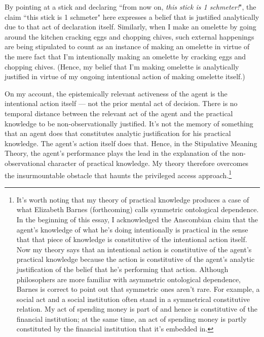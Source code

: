 \documentclass[a4paper,12pt]{article}
\begin{document}

By pointing at a stick and declaring ``from now on, \emph{this stick is 1 schmeter!}", the claim ``this stick is 1 schmeter" here expresses a belief that is justified analytically due to that act of declaration itself. Similarly, when I make an omelette by going around the kitchen cracking eggs and chopping chives, such external happenings are being stipulated to count as an instance of making an omelette in virtue of the mere fact that I'm intentionally making an omelette by cracking eggs and chopping chives. (Hence, my belief that I'm making omelette is analytically justified in virtue of my ongoing intentional action of making omelette itself.)

On my account, the epistemically relevant activeness of the agent is the intentional action itself --- not the prior mental act of decision. There is no temporal distance between the relevant act of the agent and the practical knowledge to be non-observationally justified. It's not the memory of something that an agent does that constitutes analytic justification for his practical knowledge. The agent's action itself does that. Hence, in the Stipulative Meaning Theory, the agent's performance plays the lead in the explanation of the non-observational character of practical knowledge. My theory therefore overcomes the insurmountable obstacle that haunts the privileged access approach.\footnote{It's worth noting that my theory of practical knowledge produces a case of what Elizabeth Barnes (forthcoming) calls symmetric ontological dependence. In the beginning of this essay, I acknowledged the Anscombian claim that the agent's knowledge of what he's doing intentionally is practical in the sense that that piece of knowledge is constitutive of the intentional action itself. Now my theory says that an intentional action is constitutive of the agent's practical knowledge because the action is constitutive of the agent's analytic justification of the belief that he's performing that action. Although philosophers are more familiar with asymmetric ontological dependence, Barnes is correct to point out that symmetric ones aren't rare. For example, a social act and a social institution often stand in a symmetrical constitutive relation. My act of spending money is part of and hence is constitutive of the financial institution; at the same time, an act of spending money is partly constituted by the financial institution that it's embedded in.}
\end{document}
